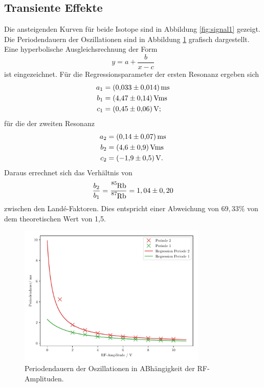 \subsection{Transiente Effekte}
Die ansteigenden Kurven für beide Isotope sind in Abbildung \ref{fig:signal1} gezeigt. Die Periodendauern der Oszillationen sind in Abbildung \ref{fig:resonanz} grafisch dargestellt.
Eine hyperbolische Ausgleichsrechnung der Form
\begin{equation}
  y=a+\frac{b}{x-c}
\end{equation}
ist eingezeichnet.
Für die Regressionsparameter der ersten Resonanz ergeben sich
\begin{align*}
  a_1&= \SI{0,033 \pm 0,014}{ms}\\
  b_1&= \SI{4,47 \pm 0,14}{V ms}\\
  c_1&= \SI{0,45 \pm 0,06}{V};
\end{align*}
für die der zweiten Resonanz
\begin{align*}
  a_2&= \SI{0,14 \pm 0,07}{ms}\\
  b_2&= \SI{4,6 \pm 0,9}{V ms}\\
  c_2&= \SI{-1,9 \pm 0,5}{V}.
\end{align*}
Daraus errechnet sich das Verhältnis von
\begin{equation*}
\frac{b_2}{b_1}=\frac{\ce{^{85}Rb}}{\ce{^{87}Rb}}=1,04 \pm 0,20
\end{equation*}
zwischen den Landé-Faktoren.
Dies entspricht einer Abweichung von $69,33\%$ von dem theoretischen Wert von 1,5\cite{anleitung}.
\begin{figure}[H]
  \centering
  \includegraphics[width=0.8\textwidth]{Berechnung/perioden.pdf}
  \caption{Periodendauern der Oszillationen in ABhängigkeit der RF-Amplituden.}
  \label{fig:resonanz}
\end{figure}
